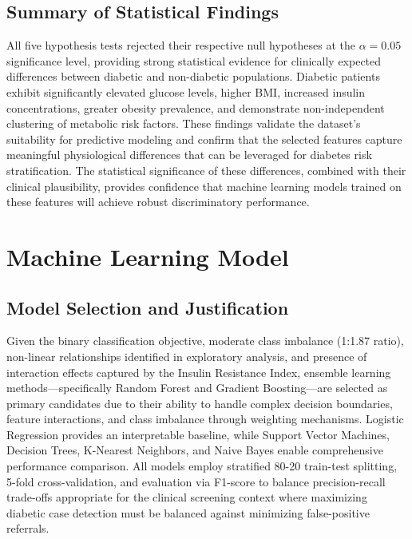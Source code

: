 \documentclass[12pt]{article}
\begin{document}
\subsection{Summary of Statistical Findings}

All five hypothesis tests rejected their respective null hypotheses at the $\alpha = 0.05$ significance level, providing strong statistical evidence for clinically expected differences between diabetic and non-diabetic populations. Diabetic patients exhibit significantly elevated glucose levels, higher BMI, increased insulin concentrations, greater obesity prevalence, and demonstrate non-independent clustering of metabolic risk factors. These findings validate the dataset's suitability for predictive modeling and confirm that the selected features capture meaningful physiological differences that can be leveraged for diabetes risk stratification. The statistical significance of these differences, combined with their clinical plausibility, provides confidence that machine learning models trained on these features will achieve robust discriminatory performance.

\section{Machine Learning Model}

\subsection{Model Selection and Justification}

Given the binary classification objective, moderate class imbalance (1:1.87 ratio), non-linear relationships identified in exploratory analysis, and presence of interaction effects captured by the Insulin Resistance Index, ensemble learning methods—specifically Random Forest and Gradient Boosting—are selected as primary candidates due to their ability to handle complex decision boundaries, feature interactions, and class imbalance through weighting mechanisms. Logistic Regression provides an interpretable baseline, while Support Vector Machines, Decision Trees, K-Nearest Neighbors, and Naive Bayes enable comprehensive performance comparison. All models employ stratified 80-20 train-test splitting, 5-fold cross-validation, and evaluation via F1-score to balance precision-recall trade-offs appropriate for the clinical screening context where maximizing diabetic case detection must be balanced against minimizing false-positive referrals.
\end{document}
